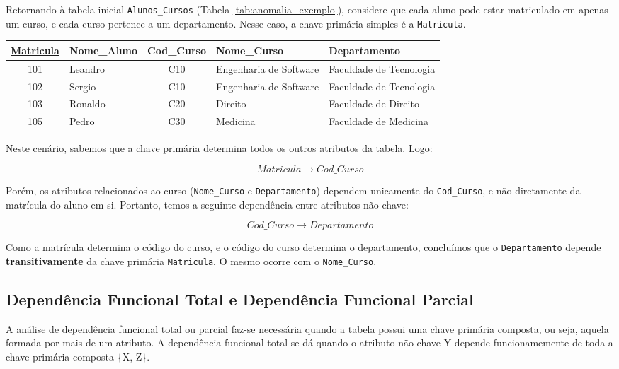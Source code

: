 \begin{tcolorbox}[breakable, colback=blue!5,colframe=blue!40!black,title=Situação exemplo]
    Retornando à tabela inicial \texttt{Alunos\_Cursos} (Tabela \ref{tab:anomalia_exemplo}), considere que cada aluno pode estar matriculado em apenas um curso, e cada curso pertence a um departamento. Nesse caso, a chave primária simples é a \texttt{Matricula}.

    \vspace{0.4cm}
    \renewcommand{\arraystretch}{1.2}

    \begin{adjustbox}{max width=\textwidth}
    \begin{tabular}{|c|l|c|l|l|}
    \hline
    \textbf{\underline{Matricula}} & \textbf{Nome\_Aluno} & \textbf{Cod\_Curso} & \textbf{Nome\_Curso} & \textbf{Departamento} \\ \hline
    101 & Leandro & C10 & Engenharia de Software & Faculdade de Tecnologia \\ \hline
    102 & Sergio & C10 & Engenharia de Software & Faculdade de Tecnologia\\ \hline
    103 & Ronaldo & C20 & Direito & Faculdade de Direito \\ \hline
    105 & Pedro & C30 & Medicina & Faculdade de Medicina \\ \hline
    \end{tabular}
\end{adjustbox}
    \vspace{0.4cm}

    Neste cenário, sabemos que a chave primária determina todos os outros atributos da tabela. Logo:

    \[
    Matricula \rightarrow Cod\_Curso
    \]

    Porém, os atributos relacionados ao curso (\texttt{Nome\_Curso} e \texttt{Departamento}) dependem unicamente do \texttt{Cod\_Curso}, e não diretamente da matrícula do aluno em si. Portanto, temos a seguinte dependência entre atributos não-chave:

    \[
    Cod\_Curso \rightarrow Departamento
    \]

    Como a matrícula determina o código do curso, e o código do curso determina o departamento, concluímos que o \texttt{Departamento} depende \textbf{transitivamente} da chave primária \texttt{Matricula}. O mesmo ocorre com o \texttt{Nome\_Curso}.
\end{tcolorbox}

\subsection{Dependência Funcional Total e Dependência Funcional Parcial}
A análise de dependência funcional total ou parcial faz-se necessária quando a tabela possui uma chave primária composta, ou seja, aquela formada por mais de um atributo. A dependência funcional total se dá quando o atributo não-chave Y depende funcionamemente de toda a chave primária composta \{X, Z\}.\cite{angelotti2010banco}

